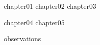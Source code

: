 \documentclass[
bibfile=\ResourcePath./references
]{\ResourcePath./hunterthesis}
\begin{document}
\ThesisFrontmatter

{chapter01}
{chapter02}
{chapter03}
{chapter04}
{chapter05}

\begin{ThesisBackmatter}
{observations}
\end{ThesisBackmatter}
\end{document}
